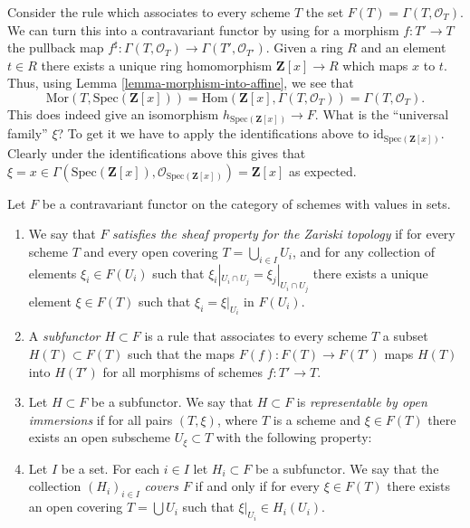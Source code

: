 \begin{example}
\label{example-global-sections}
Consider the rule which associates to every scheme $T$ the set
$F(T) = \Gamma(T, \mathcal{O}_T)$. We can turn this into a contravariant
functor by using for a morphism $f : T' \to T$ the pullback map
$f^\sharp : \Gamma(T, \mathcal{O}_T) \to \Gamma(T', \mathcal{O}_{T'})$.
Given a ring $R$ and an element $t \in R$ there exists a unique
ring homomorphism $\mathbf{Z}[x] \to R$ which maps $x$ to $t$.
Thus, using Lemma \ref{lemma-morphism-into-affine}, we see that
$$
\text{Mor}(T, \text{Spec}(\mathbf{Z}[x])) =
\text{Hom}(\mathbf{Z}[x], \Gamma(T, \mathcal{O}_T)) =
\Gamma(T, \mathcal{O}_T).
$$
This does indeed
give an isomorphism $h_{\text{Spec}(\mathbf{Z}[x])} \to F$.
What is the ``universal family'' $\xi$? To get it we have to
apply the identifications above to $\text{id}_{\text{Spec}(\mathbf{Z}[x])}$.
Clearly under the identifications above this gives
that
$\xi = x \in \Gamma(\text{Spec}(\mathbf{Z}[x]),
\mathcal{O}_{\text{Spec}(\mathbf{Z}[x])}) = \mathbf{Z}[x]$
as expected.
\end{example}

\begin{definition}
\label{definition-representable-by-open-immersions}
Let $F$ be a contravariant functor on the category
of schemes with values in sets.
\begin{enumerate}
\item We say that $F$ {\it satisfies the sheaf property for the
Zariski topology} if for every scheme $T$ and every open covering
$T = \bigcup_{i \in I} U_i$, and for any collection of elements
$\xi_i \in F(U_i)$ such that $\xi_i|_{U_i \cap U_j} =
\xi_j|_{U_i \cap U_j}$ there exists a unique element
$\xi \in F(T)$ such that $\xi_i = \xi|_{U_i}$ in $F(U_i)$.
\item A {\it subfunctor $H \subset F$} is a rule that associates
to every scheme $T$ a subset $H(T) \subset F(T)$ such that
the maps $F(f) : F(T) \to F(T')$ maps $H(T)$ into
$H(T')$ for all morphisms of schemes $f : T' \to T$.
\item Let $H \subset F$ be a subfunctor. We say that
$H \subset F$ is {\it representable by open immersions}
if for all pairs $(T, \xi)$, where $T$ is a scheme and $\xi \in F(T)$
there exists an open subscheme $U_\xi \subset T$ with the following
property:
\item Let $I$ be a set. For each $i \in I$ let $H_i \subset F$
be a subfunctor. We say that the collection $(H_i)_{i \in I}$
{\it covers $F$} if and only if for every $\xi \in F(T)$
there exists an open covering $T = \bigcup U_i$ such that
$\xi|_{U_i} \in H_i(U_i)$.
\end{enumerate}
\end{definition}

